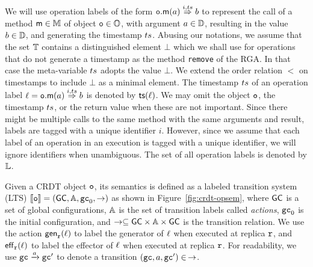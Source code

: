 We will use operation labels of the form
${{\mathtt{o}.\mathsf{m}}}(a) \overset{i,ts}{\Rightarrow} b$ to represent the call of a
method $\mathsf{m} \in \mathbb{M}$ of object $\mathtt{o}\in \mathbb{O}$, with
argument $a \in \mathbb{D}$, resulting in the value $b \in
\mathbb{D}$, and generating the timestamp $ts$.
Abusing our notations, we assume that the set $\mathbb{T}$
contains a distinguished element $\bot$ which we shall use for
operations that do not generate a timestamp as the method {\tt remove}
of the RGA.
In that case the meta-variable $ts$ adopts the value $\bot$. We extend the order
relation $<$ on timestamps to include $\bot$ as a minimal element.
The timestamp $ts$ of an operation label $\ell={{\mathtt{o}.\mathsf{m}}}(a) \overset{i,ts}{\Rightarrow} b$
is denoted by $\mathsf{ts}(\ell)$.
We may omit the object $\mathtt{o}$, the timestamp $ts$, or the return
value when these are not important.
Since there might be multiple calls to the same method with the same
arguments and result, labels are tagged with a unique identifier $i$.
However, since we assume that each label of an operation in an
execution is tagged with a unique identifier, we will ignore
identifiers when unambiguous.
The set of all operation labels is denoted by $\mathbb{L}$.
%



Given a CRDT object $\mathtt{o}$, its semantics is defined as a labeled transition
system (LTS) $\llbracket \mathtt{o} \rrbracket =
(\mathsf{GC},\mathbb{A},\mathtt{gc}_0,\rightarrow)$ as shown in
Figure~\ref{fig:crdt-opsem}, where $\mathsf{GC}$ is a set of
global configurations, $\mathbb{A}$ is the set of transition labels called \emph{actions},
$\mathtt{gc}_0$ is the initial configuration, and
$\rightarrow\subseteq \mathsf{GC} \times \mathbb{A}\times \mathsf{GC}$ is the
transition relation. 
We use the action $\mathsf{gen}_{\mathtt{r}}(\ell)$ to label the generator of $\ell$ when executed at replica $\mathtt{r}$,
and $\mathsf{eff}_{\mathtt{r}}(\ell)$ to label the effector of $\ell$ when executed at replica $\mathtt{r}$.
For readability, we use $\mathtt{gc} \xrightarrow{a} \mathtt{gc}'$
to denote a transition $(\mathtt{gc},a,\mathtt{gc}')\in\,\rightarrow$.


